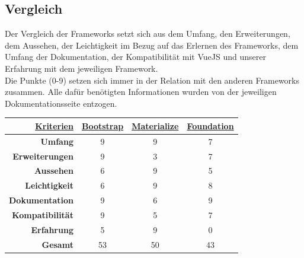 	\subsection{Vergleich}
	Der Vergleich der Frameworks setzt sich aus dem Umfang, den Erweiterungen, dem Aussehen, der Leichtigkeit im Bezug auf das Erlernen des Frameworks, dem Umfang der Dokumentation, der Kompatibilität mit VueJS und unserer Erfahrung mit dem jeweiligen Framework.\\
	Die Punkte (0-9) setzen sich immer in der Relation mit den anderen Frameworks zusammen. Alle dafür benötigten Informationen wurden von der jeweiligen Dokumentationsseite entzogen.
	\begin{table}
		\begin{tabular}{rccc}
			\hline
			\multicolumn{1}{|r|}{{\underline{\textbf{Kriterien}}}} & \multicolumn{1}{c|}{{\underline{\textbf{Bootstrap}}}} & \multicolumn{1}{c|}{{ \underline{\textbf{Materialize}}}} & \multicolumn{1}{c|}{{\underline{\textbf{Foundation}}}} \\ \hline
			\multicolumn{1}{|r|}{\textbf{Umfang}}          & \multicolumn{1}{c|}{9}                        & \multicolumn{1}{c|}{9}                          & \multicolumn{1}{c|}{7}                         \\ \hline
			\multicolumn{1}{|r|}{\textbf{Erweiterungen}}   & \multicolumn{1}{c|}{9}                        & \multicolumn{1}{c|}{3}                          & \multicolumn{1}{c|}{7}                         \\ \hline
			\multicolumn{1}{|r|}{\textbf{Aussehen}}        & \multicolumn{1}{c|}{6}                        & \multicolumn{1}{c|}{9}                          & \multicolumn{1}{c|}{5}                         \\ \hline
			\multicolumn{1}{|r|}{\textbf{Leichtigkeit}}    & \multicolumn{1}{c|}{6}                        & \multicolumn{1}{c|}{9}                          & \multicolumn{1}{c|}{8}                         \\ \hline
			\multicolumn{1}{|r|}{\textbf{Dokumentation}}   & \multicolumn{1}{c|}{9}                        & \multicolumn{1}{c|}{6}                          & \multicolumn{1}{c|}{9}                         \\ \hline
			\multicolumn{1}{|r|}{\textbf{Kompatibilität}}  & \multicolumn{1}{c|}{9}                        & \multicolumn{1}{c|}{5}                          & \multicolumn{1}{c|}{7}                         \\ \hline
			\multicolumn{1}{|r|}{\textbf{Erfahrung}}       & \multicolumn{1}{c|}{5}                        & \multicolumn{1}{c|}{9}                          & \multicolumn{1}{c|}{0}                         \\ \hline
			\textbf{Gesamt}                                & 53                                            & 50                                              & 43                                            
		\end{tabular}
	\end{table}
